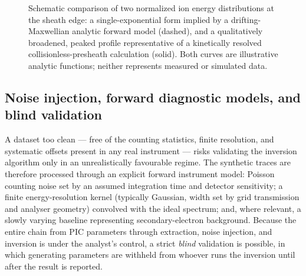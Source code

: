 \begin{figure}[htbp]
\centering
{}
\caption{Schematic comparison of two normalized ion energy distributions at the sheath edge: a single-exponential form implied by a drifting-Maxwellian analytic forward model (dashed), and a qualitatively broadened, peaked profile representative of a kinetically resolved collisionless-presheath calculation (solid). Both curves are illustrative analytic functions; neither represents measured or simulated data.}
\label{fig:iedf_schematic}
\end{figure}

\subsection{Noise injection, forward diagnostic models, and blind validation}

A dataset too clean --- free of the counting statistics, finite resolution, and systematic offsets present in any real instrument --- risks validating the inversion algorithm only in an unrealistically favourable regime. The synthetic traces are therefore processed through an explicit forward instrument model: Poisson counting noise set by an assumed integration time and detector sensitivity; a finite energy-resolution kernel (typically Gaussian, width set by grid transmission and analyser geometry) convolved with the ideal spectrum; and, where relevant, a slowly varying baseline representing secondary-electron background. Because the entire chain from PIC parameters through extraction, noise injection, and inversion is under the analyst's control, a strict \emph{blind} validation is possible, in which generating parameters are withheld from whoever runs the inversion until after the result is reported.

